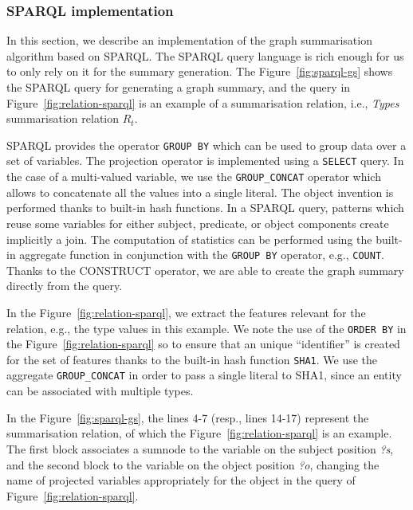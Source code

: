 \subsubsection{SPARQL implementation}

In this section, we describe an implementation of the graph summarisation algorithm based on SPARQL. The SPARQL query language is rich enough for us to only rely on it for the summary generation.
The Figure~\ref{fig:sparql-gs} shows the SPARQL query for generating a graph summary, and the query in Figure~\ref{fig:relation-sparql} is an example of a summarisation relation, i.e., \emph{Types} summarisation relation $R_t$.


SPARQL provides the operator \texttt{GROUP BY} which can be used to group data over a set of variables. The projection operator is implemented using a \texttt{SELECT} query. In the case of a multi-valued variable, we use the \texttt{GROUP\_CONCAT} operator which allows to concatenate all the values into a single literal. The object invention is performed thanks to built-in hash functions. In a SPARQL query, patterns which reuse some variables for either subject, predicate, or object components create implicitly a join. The computation of statistics can be performed using the built-in aggregate function in conjunction with the \texttt{GROUP BY} operator, e.g., \texttt{COUNT}. Thanks to the CONSTRUCT operator, we are able to create the graph summary directly from the query.


In the Figure~\ref{fig:relation-sparql}, we extract the features relevant for the relation, e.g., the type values in this example. We note the use of the \texttt{ORDER BY} in the Figure~\ref{fig:relation-sparql} so to ensure that an unique ``identifier'' is created for the set of features thanks to the built-in hash function \texttt{SHA1}. We use the aggregate \texttt{GROUP\_CONCAT} in order to pass a single literal to SHA1, since an entity can be associated with multiple types.


In the Figure~\ref{fig:sparql-gs}, the lines 4-7 (resp., lines 14-17) represent the summarisation relation, of which the Figure~\ref{fig:relation-sparql} is an example. The first block associates a sumnode to the variable on the subject position \emph{?s}, and the second block to the variable on the object position \emph{?o}, changing the name of projected variables appropriately for the object in the query of Figure~\ref{fig:relation-sparql}.

